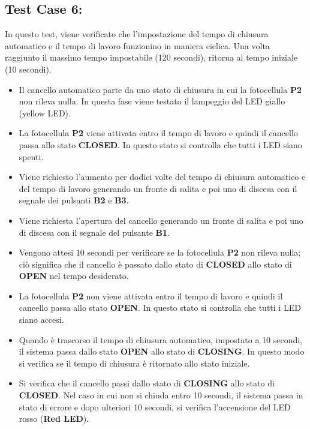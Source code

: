\documentclass[12pt]{article}
\begin{document}
\subsection{Test Case 6: }
In questo test, viene verificato che l'impostazione del tempo di chiusura automatico e il tempo di lavoro funzionino in maniera ciclica. Una volta raggiunto il massimo tempo impostabile (120 secondi), ritorna al tempo iniziale (10 secondi).

\begin{itemize}

    \item Il cancello automatico parte da uno stato di chiusura in cui la fotocellula \textbf{P2} non rileva nulla. In questa fase viene testato il lampeggio del LED giallo (yellow LED).
    \item La fotocellula \textbf{P2} viene attivata entro il tempo di lavoro e quindi il cancello passa allo stato \textbf{CLOSED}. In questo stato si controlla che tutti i LED siano spenti.
    \item Viene richiesto l'aumento per dodici volte del tempo di chiusura automatico e del tempo di lavoro generando un fronte di salita e poi uno di discesa con il segnale dei pulsanti \textbf{B2} e \textbf{B3}.
    \item Viene richiesta l’apertura del cancello generando un fronte di salita e poi uno di discesa con il segnale del pulsante \textbf{B1}.
    \item Vengono attesi 10 secondi per verificare se la fotocellula \textbf{P2} non rileva nulla; ciò significa che il cancello è passato dallo stato di \textbf{CLOSED} allo stato di \textbf{OPEN} nel tempo desiderato.
    \item La fotocellula \textbf{P2} non viene attivata entro il tempo di lavoro e quindi il cancello passa allo stato \textbf{OPEN}. In questo stato si controlla che tutti i LED siano accesi.
    \item Quando è trascorso il tempo di chiusura automatico, impostato a 10 secondi, il sistema passa dallo stato \textbf{OPEN} allo stato di \textbf{CLOSING}. In questo modo si verifica se il tempo di chiusura è ritornato allo stato iniziale.
    \item Si verifica che il cancello passi dallo stato di \textbf{CLOSING} allo stato di \textbf{CLOSED}. Nel caso in cui non si chiuda entro 10 secondi, il sistema passa in stato di errore e dopo ulteriori 10 secondi, si verifica l'accensione del LED rosso (\textbf{Red LED}).

\end{itemize}
\end{document}
